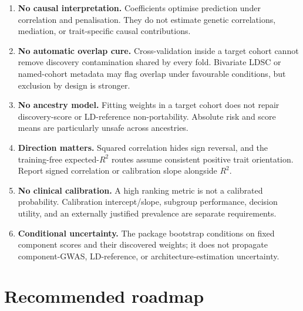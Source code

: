 \documentclass[10pt,a4paper]{article}
\newcommand{\Rtwo}{\(R^2\)}
\begin{document}
\begin{enumerate}
  \item \textbf{No causal interpretation.} Coefficients optimise prediction
  under correlation and penalisation. They do not estimate genetic
  correlations, mediation, or trait-specific causal contributions.
  \item \textbf{No automatic overlap cure.} Cross-validation inside a target
  cohort cannot remove discovery contamination shared by every fold.
  Bivariate LDSC or named-cohort metadata may flag overlap under favourable
  conditions, but exclusion by design is stronger.
  \item \textbf{No ancestry model.} Fitting weights in a target cohort does not
  repair discovery-score or LD-reference non-portability. Absolute risk and
  score means are particularly unsafe across ancestries.
  \item \textbf{Direction matters.} Squared correlation hides sign reversal,
  and the training-free expected-\Rtwo{} routes assume consistent positive
  trait orientation. Report signed correlation or calibration slope alongside
  \Rtwo{}.
  \item \textbf{No clinical calibration.} A high ranking metric is not a
  calibrated probability. Calibration intercept/slope, subgroup performance,
  decision utility, and an externally justified prevalence are separate
  requirements.
  \item \textbf{Conditional uncertainty.} The package bootstrap conditions on
  fixed component scores and their discovered weights; it does not propagate
  component-GWAS, LD-reference, or architecture-estimation uncertainty.
\end{enumerate}

\section{Recommended roadmap}
\label{sec:roadmap}
\end{document}
